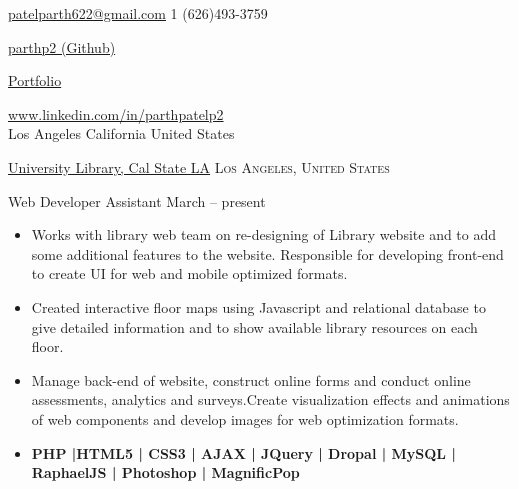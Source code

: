 \documentclass[10pt,a4paper]{article}
\begin{document}
\sloppy  %


\nobreakvspace{0.4em}  %

\noindent\href{mailto:patelparth622.at.gmail.dot.com}{patelparth622\mbox{}@\mbox{}gmail.com}\sbull
\textsmaller{+}1 (626)493-3759\sbull
{\newnums \href{https://github.com/parthp2}{parthp2 (Github)}\sbull
{\newnums \href{http://www.patelparth.net/}{Portfolio}\sbull
{\mewmums \href{https://www.linkedin.com/in/parthpatelp2/}{www.linkedin.com/in/parthpatelp2}
\\
{Los Angeles\sbull
California\sbull
United States
}
\spacedhrule{0.0em}{-0.4em}  %




\headedsection  %
  {\href{http://web.calstatela.edu/library/}{University Library, Cal State LA}}
  {\textsc{Los Angeles, United States}} {%
  \headedsubsection
    {Web Developer Assistant}
    {March  -- present}
    {\bodytext
    {
    \begin{itemize}
        \item Works with library web team on re-designing of  Library website and to add some additional features to the website. Responsible for developing front-end to create UI for web and mobile optimized formats.
        \item Created interactive floor maps using Javascript and relational database to give detailed information and to show available library resources on each floor.
        \item Manage back-end of website, construct online forms and conduct online assessments, analytics and surveys.Create visualization effects and animations of web components and develop images for web optimization formats.
        \item \textbf{\small{ PHP |HTML5 | CSS3 | AJAX | JQuery | Dropal | MySQL | RaphaelJS | Photoshop | MagnificPop  }}
    \end{itemize}}}
}

}}}
\end{document}
